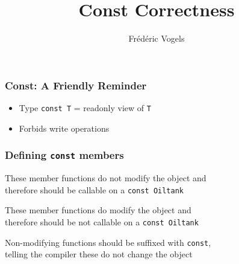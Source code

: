 
\usetikzlibrary{shadows,shapes.multipart}

\title{Const Correctness}
\author{Fr\'ed\'eric Vogels}



\begin{frame}
  \titlepage
\end{frame}

\begin{frame}
  \frametitle{Const: A Friendly Reminder}
  \begin{itemize}
    \item Type {\tt const T} = readonly view of {\tt T}
    \item Forbids write operations
  \end{itemize}
  \vskip5mm
  \begin{overprint}

  \end{overprint}
  \vskip5mm
\end{frame}

\begin{frame}
  \frametitle{Defining {\tt const} members}
  \begin{overprint}
    \begin{center}
      These member functions do not modify the object
      and \\ therefore should be callable on a \texttt{const Oiltank}
    \end{center}

    \begin{center}
      These member functions do modify the object
      and \\ therefore should be not callable on a \texttt{const Oiltank}
    \end{center}

    \begin{center}
      Non-modifying functions should be suffixed with \texttt{const},\\
      telling the compiler these do not change the object
    \end{center}
  \end{overprint}
\end{frame}

